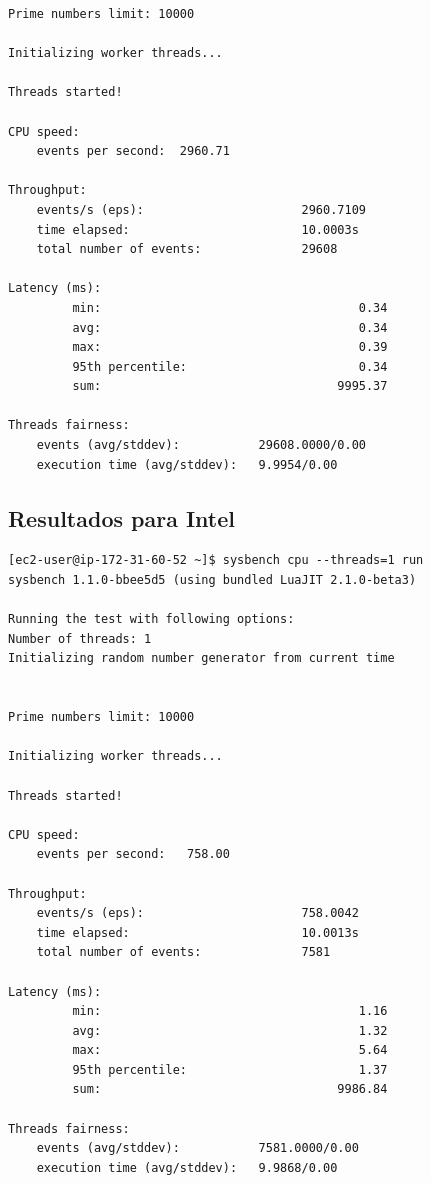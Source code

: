 \documentclass[a4paper,openright,12pt]{article}
\begin{document}
\begin{appendices}
\begin{verbatim}
Prime numbers limit: 10000

Initializing worker threads...

Threads started!

CPU speed:
    events per second:  2960.71

Throughput:
    events/s (eps):                      2960.7109
    time elapsed:                        10.0003s
    total number of events:              29608

Latency (ms):
         min:                                    0.34
         avg:                                    0.34
         max:                                    0.39
         95th percentile:                        0.34
         sum:                                 9995.37

Threads fairness:
    events (avg/stddev):           29608.0000/0.00
    execution time (avg/stddev):   9.9954/0.00
\end{verbatim}
\newpage
\subsection{Resultados para Intel}
\begin{verbatim}
[ec2-user@ip-172-31-60-52 ~]$ sysbench cpu --threads=1 run
sysbench 1.1.0-bbee5d5 (using bundled LuaJIT 2.1.0-beta3)

Running the test with following options:
Number of threads: 1
Initializing random number generator from current time


Prime numbers limit: 10000

Initializing worker threads...

Threads started!

CPU speed:
    events per second:   758.00

Throughput:
    events/s (eps):                      758.0042
    time elapsed:                        10.0013s
    total number of events:              7581

Latency (ms):
         min:                                    1.16
         avg:                                    1.32
         max:                                    5.64
         95th percentile:                        1.37
         sum:                                 9986.84

Threads fairness:
    events (avg/stddev):           7581.0000/0.00
    execution time (avg/stddev):   9.9868/0.00
\end{verbatim}


\newpage

\end{appendices}
\end{document}
